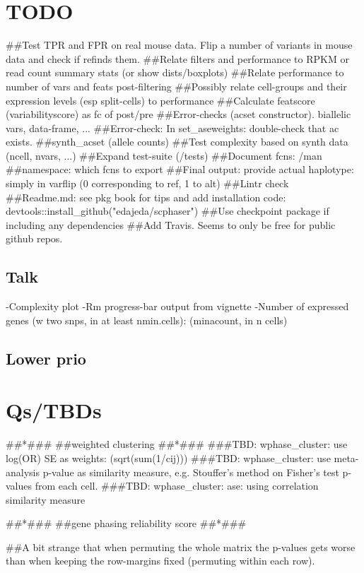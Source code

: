 



\section{TODO}
##Test TPR and FPR on real mouse data. Flip a number of variants in mouse data and check if refinds them.
##Relate filters and performance to RPKM or read count summary stats (or show dists/boxplots)
##Relate performance to number of vars and feats post-filtering
##Possibly relate cell-groups and their expression levels (esp split-cells) to performance
##Calculate featscore (variabilityscore) as fc of post/pre
##Error-checks (acset constructor). biallelic vars, data-frame, ...
##Error-check: In set_aseweights: double-check that ac exists.
##synth_acset (allele counts)
##Test complexity based on synth data (ncell, nvars, ...)
##Expand test-suite (/tests)
##Document fcns: /man
##namespace: which fcns to export
##Final output: provide actual haplotype: simply in varflip (0 corresponding to ref, 1 to alt)
##Lintr check
##Readme.md: see pkg book for tips and add installation code: devtools::install_github("edajeda/scphaser")
##Use checkpoint package if including any dependencies
##Add Travis. Seems to only be free for public github repos.

\subsection{Talk}
-Complexity plot
-Rm progress-bar output from vignette
-Number of expressed genes (w two snps, in at least nmin.cells): (minacount, in n cells)

\subsection{Lower prio}

\section{Qs/TBDs}

##*###
##weighted clustering
##*###
###TBD: wphase_cluster: use log(OR) SE as weights: (sqrt(sum(1/cij)))
###TBD: wphase_cluster: use meta-analysis p-value as similarity measure, e.g. Stouffer's method on Fisher's test p-values from each cell.
###TBD: wphase_cluster: ase: using correlation similarity measure

##*###
##gene phasing reliability score
##*###

##A bit strange that when permuting the whole matrix the p-values gets worse than when keeping the row-margins fixed (permuting within each row).


